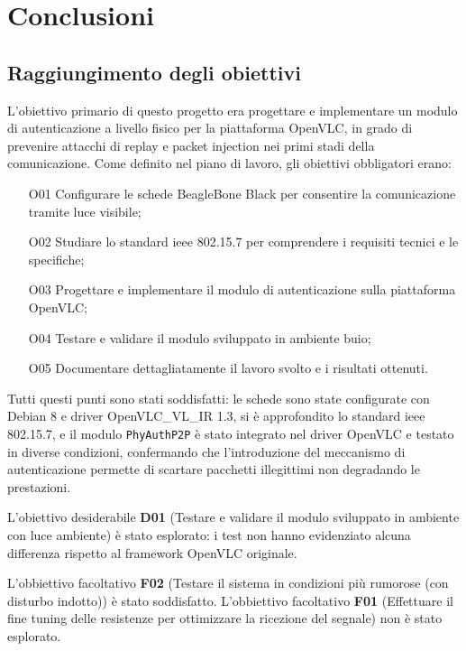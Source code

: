 \chapter{Conclusioni}
\label{cap:conclusioni}

\section{Raggiungimento degli obiettivi}
L'obiettivo primario di questo progetto era progettare e implementare un modulo di autenticazione a livello fisico per la piattaforma OpenVLC, in grado di prevenire attacchi di replay e packet injection nei primi stadi della comunicazione. Come definito nel piano di lavoro, gli obiettivi obbligatori erano:
\begin{itemize}
  \item[O01] Configurare le schede BeagleBone Black per consentire la comunicazione tramite luce visibile;
  \item[O02] Studiare lo standard \gls{ieee} 802.15.7 per comprendere i requisiti tecnici e le specifiche;
  \item[O03] Progettare e implementare il modulo di autenticazione sulla piattaforma OpenVLC;
  \item[O04] Testare e validare il modulo sviluppato in ambiente buio;
  \item[O05] Documentare dettagliatamente il lavoro svolto e i risultati ottenuti.
\end{itemize}
Tutti questi punti sono stati soddisfatti: le schede sono state configurate con Debian 8 e driver OpenVLC\_VL\_IR 1.3, si è approfondito lo standard \gls{ieee} 802.15.7, e il modulo \texttt{PhyAuthP2P} è stato integrato nel driver OpenVLC e testato in diverse condizioni, confermando che l'introduzione del meccanismo di autenticazione permette di scartare pacchetti illegittimi non degradando le prestazioni.

L'obiettivo desiderabile \textbf{D01} (Testare e validare il modulo sviluppato in ambiente con luce ambiente) è stato esplorato: i test non hanno evidenziato alcuna differenza rispetto al framework OpenVLC originale.

L'obbiettivo facoltativo \textbf{F02} (Testare il sistema in condizioni più rumorose (con disturbo indotto)) è stato soddisfatto.
L'obbiettivo facoltativo \textbf{F01} (Effettuare il fine tuning delle resistenze per ottimizzare la ricezione del segnale) non è stato esplorato.

